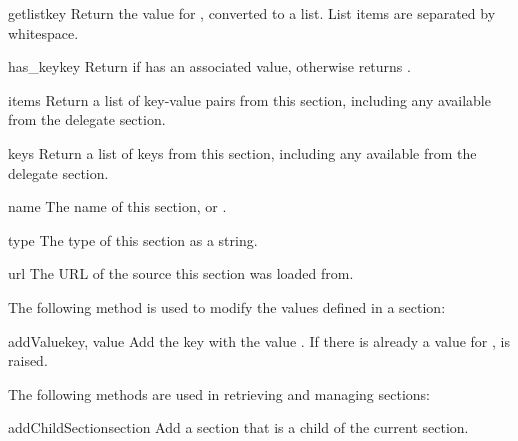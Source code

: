 \documentclass{howto}
\begin{document}
\begin{methoddesc}[Configuration]{getlist}{key}
  Return the value for , converted to a list.  List items are
  separated by whitespace.
\end{methoddesc}

\begin{methoddesc}[Configuration]{has_key}{key}
  Return  if  has an associated value, otherwise
  returns .
\end{methoddesc}

\begin{methoddesc}[Configuration]{items}{}
  Return a list of key-value pairs from this section, including any
  available from the delegate section.
\end{methoddesc}

\begin{methoddesc}[Configuration]{keys}{}
  Return a list of keys from this section, including any available
  from the delegate section.
\end{methoddesc}

\begin{memberdesc}[Configuration]{name}
  The name of this section, or .
\end{memberdesc}

\begin{memberdesc}[Configuration]{type}
  The type of this section as a string.
\end{memberdesc}

\begin{memberdesc}[Configuration]{url}
  The URL of the source this section was loaded from.
\end{memberdesc}


The following method is used to modify the values defined in a
section:

\begin{methoddesc}[Configuration]{addValue}{key, value}
  Add the key  with the value .  If there is
  already a value for ,  is
  raised.
\end{methoddesc}


The following methods are used in retrieving and managing sections:

\begin{methoddesc}[Configuration]{addChildSection}{section}
  Add a section that is a child of the current section.
\end{methoddesc}
\end{document}
